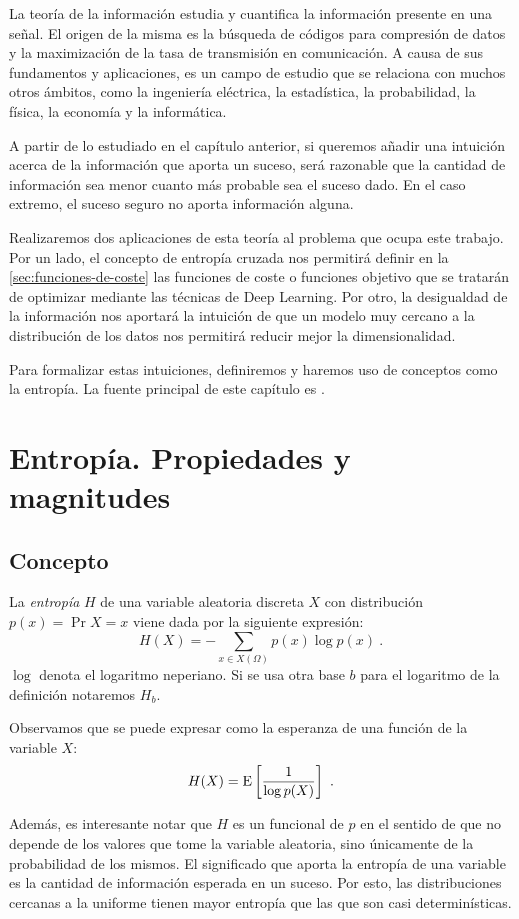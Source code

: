 La teoría de la información estudia y cuantifica la información presente
en una señal. El origen de la misma es la búsqueda de códigos para
compresión de datos y la maximización de la tasa de transmisión en
comunicación. A causa de sus fundamentos y aplicaciones, es un campo de
estudio que se relaciona con muchos otros ámbitos, como la ingeniería
eléctrica, la estadística, la probabilidad, la física, la economía y la
informática.

A partir de lo estudiado en el capítulo anterior, si queremos añadir una
intuición acerca de la información que aporta un suceso, será razonable
que la cantidad de información sea menor cuanto más probable sea el
suceso dado. En el caso extremo, el suceso seguro no aporta información
alguna.

Realizaremos dos aplicaciones de esta teoría al problema que ocupa este trabajo. Por un lado, el concepto de entropía cruzada nos permitirá definir en la \autoref{sec:funciones-de-coste} las funciones de coste o funciones objetivo que se tratarán de optimizar mediante las técnicas de Deep Learning. Por otro, la desigualdad de la información nos aportará la intuición de que un modelo muy cercano a la distribución de los datos nos permitirá reducir mejor la dimensionalidad.

Para formalizar estas intuiciones, definiremos y haremos uso de
conceptos como la entropía. La fuente principal de este capítulo es
\textcite{coverit}.

\section{Entropía. Propiedades y
magnitudes}\label{entropuxeda.-propiedades-y-magnitudes}

\subsection{Concepto}\label{concepto}

La \emph{entropía} \(H\) de una variable aleatoria discreta \(X\) con
distribución \(p(x)=\Pr{X=x}\) viene dada por la siguiente expresión:
\[H(X)=-\sum_{x\in X(\Omega)}p(x)\log p(x)~.\] $\log$ denota el logaritmo neperiano. Si se usa otra base
\(b\) para el logaritmo de la definición notaremos \(H_{b}\). 

Observamos que se puede expresar como la esperanza de una función de la
variable \(X\): \[H(X)=\mathrm{E}\left[\frac 1 {\log p(X)}\right]~.\]

Además, es interesante notar que \(H\) es un funcional de \(p\) en el
sentido de que no depende de los valores que tome la variable aleatoria,
sino únicamente de la probabilidad de los mismos. El significado que
aporta la entropía de una variable es la cantidad de información
esperada en un suceso. Por esto, las distribuciones cercanas a la
uniforme tienen mayor entropía que las que son casi determinísticas.

